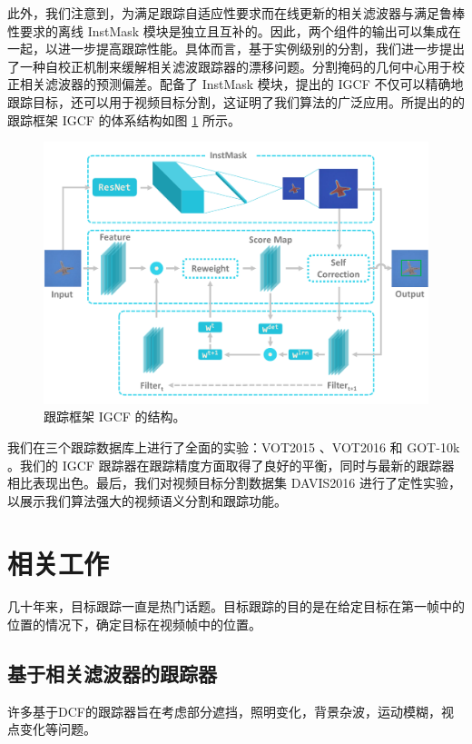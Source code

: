 此外，我们注意到，为满足跟踪自适应性要求而在线更新的相关滤波器与满足鲁棒性要求的离线 InstMask 模块是独立且互补的。因此，两个组件的输出可以集成在一起，以进一步提高跟踪性能。具体而言，基于实例级别的分割，我们进一步提出了一种自校正机制来缓解相关滤波跟踪器的漂移问题。分割掩码的几何中心用于校正相关滤波器的预测偏差。配备了 InstMask 模块，提出的 IGCF 不仅可以精确地跟踪目标，还可以用于视频目标分割，这证明了我们算法的广泛应用。所提出的的跟踪框架 IGCF 的体系结构如图 \ref{fig:IGCF} 所示。

\begin{figure}
    \centering
    \includegraphics[width=1.0\textwidth]{Img/IGCF/instmask1.pdf}
    \caption{跟踪框架 IGCF 的结构。}
    \label{fig:IGCF}
\end{figure}

我们在三个跟踪数据库上进行了全面的实验：VOT2015 \cite{Kristan2015TheVO}、VOT2016 \cite{Kristan2016TheVO} 和 GOT-10k \cite{GOT-10k}。我们的 IGCF 跟踪器在跟踪精度方面取得了良好的平衡，同时与最新的跟踪器相比表现出色。最后，我们对视频目标分割数据集 DAVIS2016 \cite{Perazzi2016} 进行了定性实验，以展示我们算法强大的视频语义分割和跟踪功能。

\section{相关工作}
几十年来，目标跟踪一直是热门话题。目标跟踪的目的是在给定目标在第一帧中的位置的情况下，确定目标在视频帧中的位置。

\subsection{基于相关滤波器的跟踪器}
许多基于DCF的跟踪器旨在考虑部分遮挡，照明变化，背景杂波，运动模糊，视点变化等问题。

